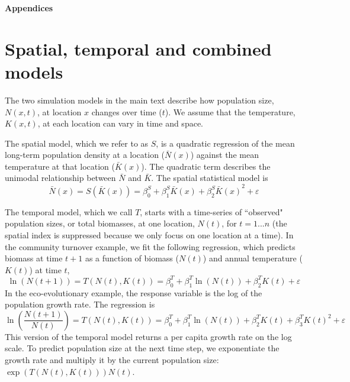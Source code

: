 \documentclass[11pt]{article}
\begin{document}
\newpage
\renewcommand{\refname}{Literature cited}





\clearpage 
\newpage 

\setcounter{page}{1}
\setcounter{equation}{0}
\setcounter{figure}{0}
\setcounter{section}{0}
\setcounter{table}{0}

\centerline{\Large \textbf{Appendices}}

\renewcommand{\thesection}{\Alph{section}}

\section{Spatial, temporal and combined models}\label{models}

The two simulation models in the main text describe how population size, $N(x,t)$, at location $x$ changes over time ($t$). We assume that the temperature, $K(x,t)$, at each location can vary in time and space.    

The spatial model, which we refer to as $S$, is a quadratic regression of the mean long-term population density at a location ($\bar{N}(x)$) against the mean temperature at that location ($\bar{K}(x)$).  The quadratic term describes the unimodal relationship between $\bar{N}$ and $\bar{K}$. The spatial statistical model is
\begin{equation}
\bar{N}(x) = S(\bar{K}(x)) = \beta^S_0 +  \beta^S_1 \bar{K}(x) +\beta^S_2 {\bar{K}(x)}^2 + \varepsilon
\label{eqn:spatial_regression}
\end{equation}

The temporal model, which we call $T$, starts with a time-series of ``observed" population sizes, or total biomasses, at one location, $N(t)$, for $t=1...n$ (the spatial index is suppressed because we only focus on one location at a time). In the community turnover example, we fit the following regression, which predicts biomass at time $t+1$ as a function of biomass ($N(t)$) and annual temperature ($K(t)$) at time $t$,
\begin{equation}
\ln(N(t+1)) = T(N(t),K(t)) = \beta^T_0 +  \beta^T_1 \ln(N(t)) +\beta^T_2 K(t)  +  \varepsilon
\label{eqn:temporal_regression_community1}
\end{equation}
In the eco-evolutionary example, the response variable is the log of the population growth rate. The regression is 
\begin{equation}
\ln\left(\frac{N(t+1)}{N(t)}\right) = T(N(t),K(t)) = \beta^T_0 +  \beta^T_1 \ln(N(t)) +\beta^T_2 K(t)  +\beta^T_3 K(t)^2 +  \varepsilon
\label{eqn:temporal_regression_ecoevo2}
\end{equation}
This version of the temporal model returns a per capita growth rate on the log scale. To predict population size at the next time step, we exponentiate the growth rate and multiply it by the current population size: $\exp(T(N(t),K(t))) N(t)$.
\end{document}
